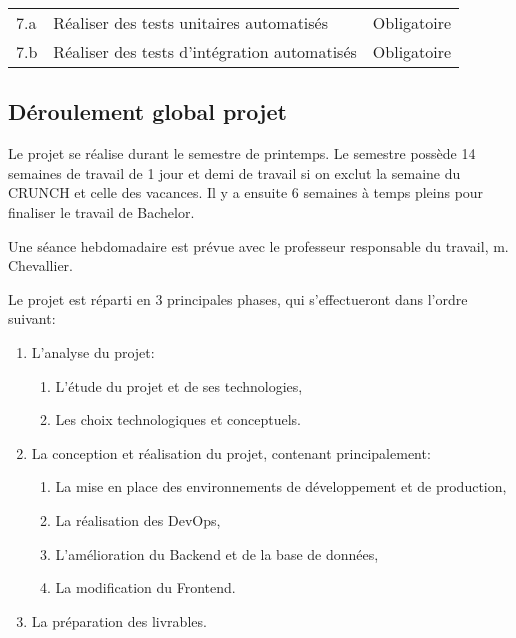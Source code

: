 \documentclass[
    iai, %
    il, %
]{heig-tb}
\begin{document}
\begin{table}[h]
\begin{center}
\begin{tabularx}{0.8\textwidth} {
                | >{\centering\arraybackslash}X
                | >{\centering\arraybackslash}X
                | >{\centering\arraybackslash}X |}
            7.a & Réaliser des tests unitaires automatisés                                                                               & Obligatoire   \\
            7.b & Réaliser des tests d'intégration automatisés                                                                           & Obligatoire   \\
        \end{tabularx}
    \end{center}
\end{table}

\subsection{Déroulement global projet}

Le projet se réalise durant le semestre de printemps. Le semestre possède 14 semaines de travail de 1 jour et demi de travail si on exclut la semaine du CRUNCH et celle des vacances.
Il y a ensuite 6 semaines à temps pleins pour finaliser le travail de Bachelor.

Une séance hebdomadaire est prévue avec le professeur responsable du travail, m. Chevallier.

Le projet est réparti en 3 principales phases, qui s'effectueront dans l'ordre suivant:
\begin{enumerate}
    \def\labelenumi{\arabic{enumi}.}
    \item L'analyse du projet:
          \begin{enumerate}
              \def\labelenumii{\alph{enumii}.}
              \item L'étude du projet et de ses technologies,
              \item Les choix technologiques et conceptuels.
          \end{enumerate}
    \item La conception et réalisation du projet, contenant principalement:
          \begin{enumerate}
              \def\labelenumii{\alph{enumii}.}
              \item La mise en place des environnements de développement et de production,
              \item La réalisation des DevOps,
              \item L'amélioration du Backend et de la base de données,
              \item La modification du Frontend.
          \end{enumerate}
    \item La préparation des livrables.
\end{enumerate}
\end{document}
